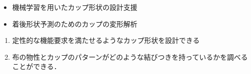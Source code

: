 \documentclass[11pt]{jsarticle}
\begin{document}
	\articleSPRabst
		\begin{itemize}
			\item 機械学習を用いたカップ形状の設計支援
			\item 着後形状予測のためのカップの変形解析
		\end{itemize}
		
		
	\articleSPRobj
		\begin{enumerate}
			\item 定性的な機能要求を満たせるようなカップ形状を設計できる
			\item 布の物性とカップのパターンがどのような結びつきを持っているかを調べることができる．
		\end{enumerate}
	\articleSPRitemsone
		
		\tableofcontents
		
		
	\articleSPRitemstwo
	\renewcommand{\labelitemi}{$\blacktriangledown$}
	\newcommand{\argmax}{\mathop{\rm arg~max}\limits}
	\newcommand{\argmin}{\mathop{\rm arg~min}\limits}
\end{document}
